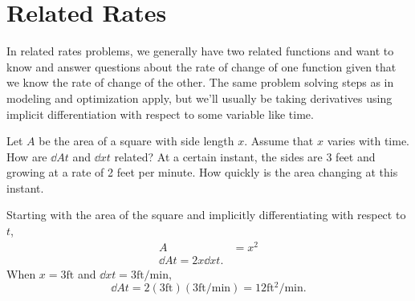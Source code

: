 \section{Related Rates}
In related rates problems, we generally have two related functions and want to know and answer questions about the rate of change of one function given that we know the rate of change of the other. The same problem solving steps as in modeling and optimization apply, but we'll usually be taking derivatives using implicit differentiation with respect to some variable like time.

\begin{example}
	Let $A$ be the area of a square with side length $x$.
	Assume that $x$ varies with time.
	How are $\dd{A}{t}$ and $\dd{x}{t}$ related?
	At a certain instant, the sides are 3 feet and growing at a rate of 2 feet per minute.
	How quickly is the area changing at this instant.
\end{example}
Starting with the area of the square and implicitly differentiating with respect to $t$,
\begin{align*}
	A &= x^2 \\
	\dd{A}{t} = 2x\dd{x}{t}.
\end{align*}
\indent
When $x=3\text{ft}$ and $\dd{x}{t}=3\text{ft/min}$,
\begin{equation*}
	\dd{A}{t} = 2(3\text{ft})(3\text{ft/min}) = 12\text{ft$^2$/min}.
\end{equation*}

